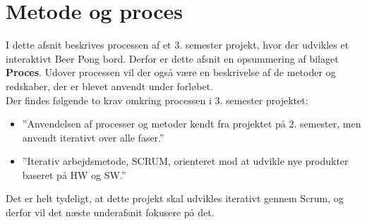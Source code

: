 \documentclass[Rapport/Rapport_main.tex]{subfiles}
\begin{document}
\section{Metode og proces}
I dette afsnit beskrives processen af et 3. semester projekt, hvor der udvikles et interaktivt Beer Pong bord. Derfor er dette afsnit en opsummering af bilaget \textbf{Proces}. Udover processen vil der også være en beskrivelse af de metoder og redskaber, der er blevet anvendt under forløbet. \\
Der findes følgende to krav omkring processen i 3. semester projektet\cite{Universitet2018}:
\begin{itemize}
    \item ''Anvendelsen af processer og metoder kendt fra projektet på 2. semester, men anvendt iterativt over alle faser.''
    \item ''Iterativ arbejdsmetode, SCRUM, orienteret mod at udvikle nye produkter baseret på HW og SW.''
\end{itemize}
Det er helt tydeligt, at dette projekt skal udvikles iterativt gennem Scrum, og derfor vil det næste underafsnit fokusere på det.
\end{document}
